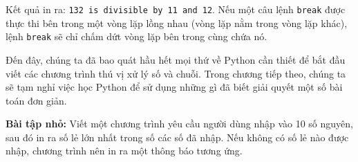 Kết quả in ra: \texttt{132 is divisible by 11 and 12}. Nếu một câu lệnh \texttt{break} được thực thi bên trong một vòng lặp lồng nhau (vòng lặp nằm trong vòng lặp khác), lệnh \texttt{break} sẽ chỉ chấm dứt vòng lặp bên trong cùng chứa nó.

Đến đây, chúng ta đã bao quát hầu hết mọi thứ về Python cần thiết để bắt đầu viết các chương trình thú vị xử lý số và chuỗi. Trong chương tiếp theo, chúng ta sẽ tạm nghỉ việc học Python để sử dụng những gì đã biết giải quyết một số bài toán đơn giản.

\noindent \textbf{Bài tập nhỏ:} Viết một chương trình yêu cầu người dùng nhập vào 10 số nguyên, sau đó in ra số lẻ lớn nhất trong số các số đã nhập. Nếu không có số lẻ nào được nhập, chương trình nên in ra một thông báo tương ứng.

